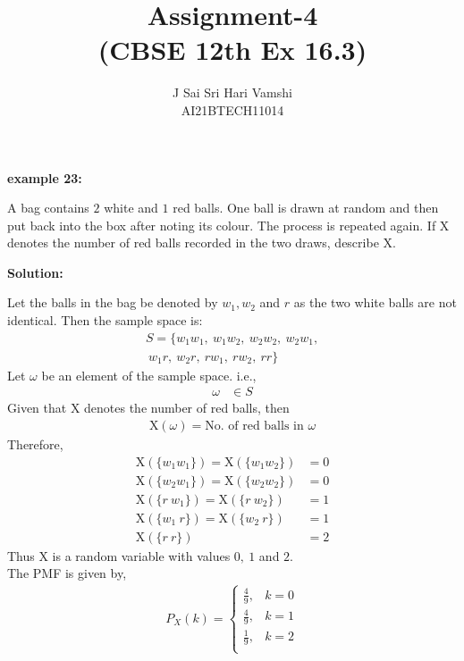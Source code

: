 \documentclass[journal,12pt,twocolumn]{IEEEtran}\usepackage[margin=1.25 in]{geometry}
\title{\LARGE{\textbf{Assignment-4}\\(CBSE 12th Ex 16.3)}}
\author{\normalsize J Sai Sri Hari Vamshi\\ \footnotesize AI21BTECH11014}
\date{}
\providecommand{\x}[1]{\ensuremath{\text{X}\left(#1\right)}}
\providecommand{\p}[1]{\ensuremath{{P_X}\left(#1\right)}}
\begin{document}
\maketitle
\begin{center}
    \textbf{\large example 23:}
\end{center}

\noindent A bag contains $2$ white and $1$ red balls. One ball is drawn at random and then put back into the box after noting its colour. The process is repeated again. If X denotes the number of red balls recorded in the two draws, describe X.

\begin{center}
    \textbf{\large Solution:}
\end{center}

\noindent Let the balls in the bag be denoted by $w_1, w_2$ and $r$ as the two white balls are not identical.
\noindent Then the sample space is:
	\begin{align*}
	S  = \{w_1 w_1,\ w_1 w_2,\ w_2 w_2,\ w_2 w_1,\\ \ w_1 r,\ w_2 r,\ r w_1,\ r 	w_2,\ r r\}
	\end{align*}
\noindent Let $\omega$ be an element of the sample space. i.e.,
	\begin{align*}
	\omega & \in S
	\end{align*}
\noindent Given that X denotes the number of red balls, then 
	\begin{align*}
	\x{\omega} = \text{No. of red balls in }\omega
	\end{align*}
\noindent Therefore,
	\begin{align*}
	\x{\{w_1 w_1\}} = \x{\{w_1 w_2\}} & = 0\\ \x{\{w_2 w_1\}} = \x{\{w_2 w_2\}} & = 0\\
	\x{\{r\ w_1\}} = \x{\{r\ w_2\}} & = 1\\ \x{\{w_1\ r\}} = \x{\{w_2\ r\}} & = 1\\
	\x{\{r\ r\}} & = 2
	\end{align*}
\noindent Thus X is a random variable with values $0,\ 1$ and $2$.\\
\noindent The PMF is given by,
	\begin{align*}
	\p k = 
		\begin{cases}
		\frac{4}{9}, & k = 0\\
		\frac{4}{9}, & k = 1\\
		\frac{1}{9}, & k = 2\\
		\end{cases}		
	\end{align*}
\end{document}

